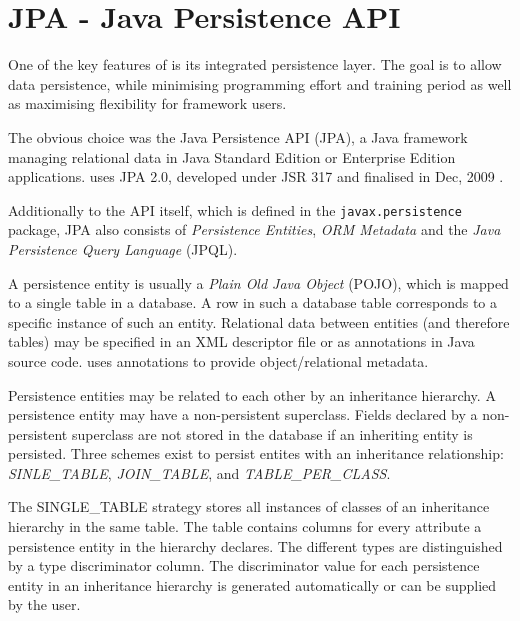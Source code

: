 \section{JPA - Java Persistence API}
\label{sec:jpa}
One of the key features of \salespoint{} is its integrated persistence layer. The goal is to allow data persistence, while minimising programming effort and training period as well as maximising flexibility for framework users.

The obvious choice was the Java Persistence API (JPA), a Java framework managing relational data in Java Standard Edition or Enterprise Edition applications. \salespoint{} uses JPA 2.0, developed under JSR 317 and finalised in Dec, 2009 \cite{jpa}.

Additionally to the API itself, which is defined in the \texttt{javax.persistence} package, JPA also consists of \textit{Persistence Entities}, \textit{ORM Metadata} and the \textit{Java Persistence Query Language} (JPQL).

A persistence entity is usually a \textit{Plain Old Java Object} (POJO), which is mapped to a single table in a database.
A row in such a database table corresponds to a specific instance of such an entity.
Relational data between entities (and therefore tables) may be specified in an XML descriptor file or as annotations in Java source code.
\salespoint{} uses annotations to provide object/relational metadata.

Persistence entities may be related to each other by an inheritance hierarchy.
A persistence entity may have a non-persistent superclass.
Fields declared by a non-persistent superclass are not stored in the database if an inheriting entity is persisted.
Three schemes exist to persist entites with an inheritance relationship: \textit{SINLE\_TABLE}, \textit{JOIN\_TABLE}, and \textit{TABLE\_PER\_CLASS}.

The SINGLE\_TABLE strategy stores all instances of classes of an inheritance hierarchy in the same table.
The table contains columns for every attribute a persistence entity in the hierarchy declares.
The different types are distinguished by a type discriminator column.
The discriminator value for each persistence entity in an inheritance hierarchy is generated automatically or can be supplied by the user.

